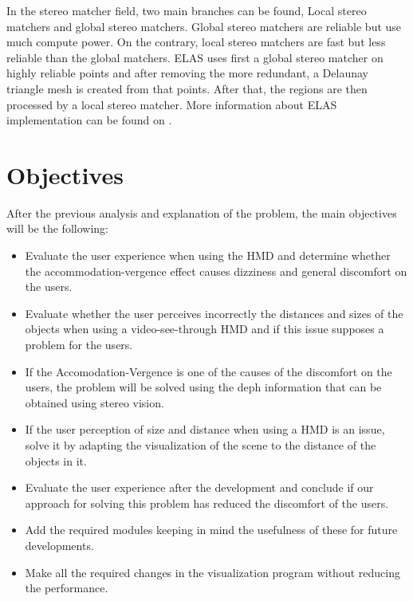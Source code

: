 \documentclass[10pt,a4paper,twocolumn,twoside]{article}
\begin{document}
	In the stereo matcher field, two main branches can be found, Local stereo matchers and global stereo matchers. Global stereo matchers are reliable but use much compute power. On the contrary, local stereo matchers are fast but less reliable than the global matchers. ELAS uses first a global stereo matcher on highly reliable points and after removing the more redundant, a Delaunay triangle mesh is created from that points. After that, the regions are then processed by a local stereo matcher. More information about ELAS implementation can be found on \cite{LIBELAS}. 
	

	\section{Objectives}
	After the previous analysis and explanation of the problem, the main objectives will be the following: 

	\begin{itemize}
		\item Evaluate the user experience when using the HMD and determine whether the accommodation-vergence effect causes dizziness and general discomfort on the users. 
		
		\item Evaluate whether the user perceives incorrectly the distances and sizes of the objects when using a video-see-through HMD and if this issue supposes a problem for the users.
		
		\item If the Accomodation-Vergence is one of the causes of the discomfort on the users, the problem will be solved using the deph information that can be obtained using stereo vision. 
		
		\item If the user perception of size and distance when using a HMD is an issue, solve it by adapting the visualization of the scene to the distance of the objects in it.
		
		\item Evaluate the user experience after the development and conclude if our approach for solving this problem has reduced the discomfort of the users. 
		
		\item Add the required modules keeping in mind the usefulness of these for future developments.
		
		\item Make all the required changes in the visualization program without reducing the performance. 
	\end{itemize}
\end{document}
